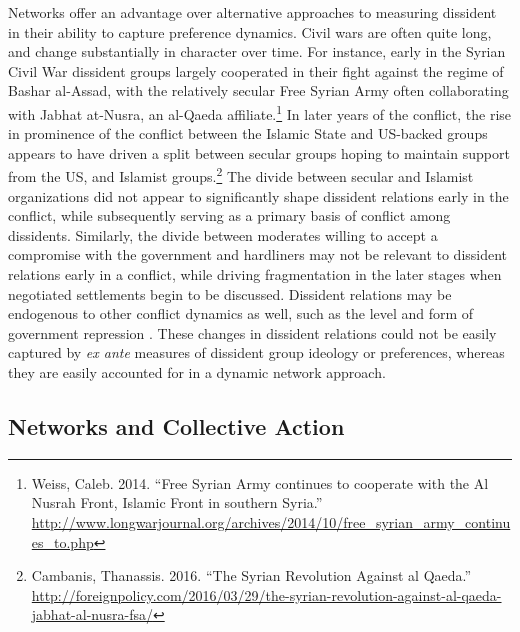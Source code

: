 Networks offer an advantage over alternative approaches to measuring dissident in their ability to capture preference dynamics. Civil wars are often quite long, and change substantially in character over time. For instance, early in the Syrian Civil War dissident groups largely cooperated in their fight against the regime of Bashar al-Assad, with the relatively secular Free Syrian Army often collaborating with Jabhat at-Nusra, an al-Qaeda affiliate.\footnote{Weiss, Caleb. 2014. ``Free Syrian Army continues to cooperate with the Al Nusrah Front, Islamic Front in southern Syria.'' \url{http://www.longwarjournal.org/archives/2014/10/free_syrian_army_continues_to.php}} In later years of the conflict, the rise in prominence of the conflict between the Islamic State and US-backed groups appears to have driven a split between secular groups hoping to maintain support from the US, and Islamist groups.\footnote{Cambanis, Thanassis. 2016. ``The Syrian Revolution Against al Qaeda.'' \url{http://foreignpolicy.com/2016/03/29/the-syrian-revolution-against-al-qaeda-jabhat-al-nusra-fsa/}} The divide between secular and Islamist organizations did not appear to significantly shape dissident relations early in the conflict, while subsequently serving as a primary basis of conflict among dissidents. Similarly, the divide between moderates willing to accept a compromise with the government and hardliners may not be relevant to dissident relations early in a conflict, while driving fragmentation in the later stages when negotiated settlements begin to be discussed. Dissident relations may be endogenous to other conflict dynamics as well, such as the level and form of government repression \citep{McLauchlin2012}. These changes in dissident relations could not be easily captured by \textit{ex ante} measures of dissident group ideology or preferences, whereas they are easily accounted for in a dynamic network approach.

\subsection{Networks and Collective Action}

